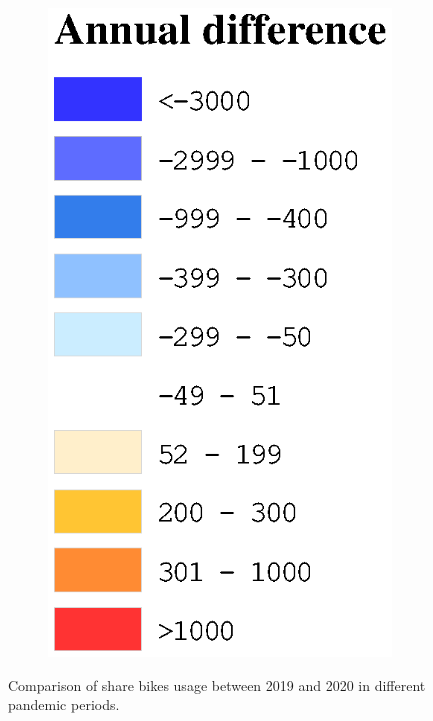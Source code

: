 \documentclass[preprints,article,accept,moreauthors,pdftex]{Definitions/mdpi}
\begin{document}
\begin{figure}[ht]
\begin{subfigure}{.14\textwidth}
        \includegraphics[width=\textwidth]{Figures/AnnualDifLegend.eps}
    \end{subfigure}
    \caption{Comparison of share bikes usage between 2019 and 2020 in different pandemic periods.}
    \label{fig:compare_2019_and_2020}
\end{figure}
\end{document}
